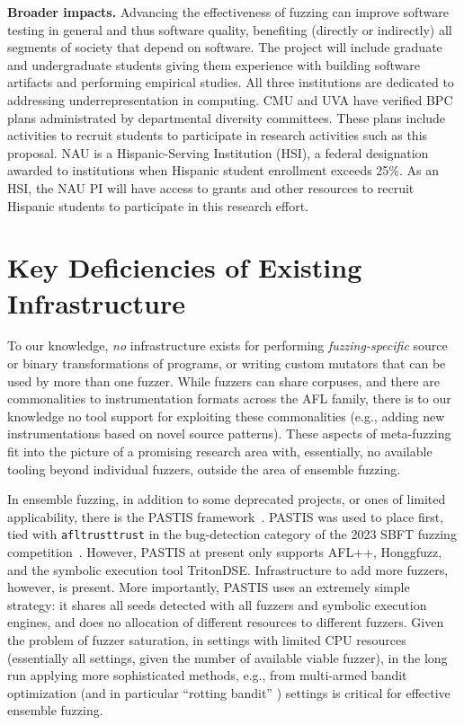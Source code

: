 \vspace{1ex}
\noindent\textbf{Broader impacts.} Advancing the effectiveness of fuzzing can improve 
software testing in general and thus software quality, benefiting (directly or indirectly) all segments of society that depend on software.
The project will include graduate and undergraduate students giving them experience with building software artifacts and performing empirical studies.
All three institutions are dedicated to addressing underrepresentation in computing.
CMU and UVA have verified BPC plans administrated by departmental diversity committees.
These plans include activities to recruit students to participate in research activities such as this proposal.
NAU is a Hispanic-Serving Institution (HSI), a federal designation awarded to institutions when Hispanic student enrollment exceeds 25\%.
As an HSI, the NAU PI will have access to grants and other resources to recruit Hispanic students to participate in this research effort.


\section{Key Deficiencies of Existing Infrastructure}

To our knowledge, \emph{no} infrastructure exists for performing 
\emph{fuzzing-specific} source or binary transformations of programs, or writing 
custom mutators that can be used by more than one fuzzer.  While
fuzzers can share corpuses, and there are commonalities to
instrumentation formats across the AFL family, there is to our
knowledge no tool support for exploiting these commonalities (e.g.,
adding new instrumentations based on novel source patterns).  These aspects of meta-fuzzing fit into the picture of a promising 
research area with, essentially, no available tooling beyond individual 
fuzzers, outside the area of ensemble fuzzing.

In ensemble fuzzing, in addition to some deprecated projects, or ones of 
limited applicability, there is the PASTIS framework~\cite{pastis}.  PASTIS was used to place first, tied 
with {\tt afltrusttrust} in the bug-detection category of the 2023 SBFT fuzzing 
competition~\cite{toolcomp}.  However, PASTIS at present only supports
AFL++, Honggfuzz, 
and the symbolic execution tool TritonDSE.  Infrastructure to add more fuzzers, 
however, is present.  More importantly, PASTIS uses an extremely simple 
strategy:  it shares all seeds detected with all fuzzers and symbolic execution 
engines, and does no allocation of different resources to different fuzzers.  
Given the problem of fuzzer saturation, in settings with limited CPU 
resources (essentially all settings, given the number of available viable 
fuzzer), in the long run applying more 
sophisticated methods, e.g., from multi-armed bandit optimization (and in 
particular ``rotting bandit'' \cite{levine2017rotting}) settings is critical for effective 
ensemble fuzzing.

